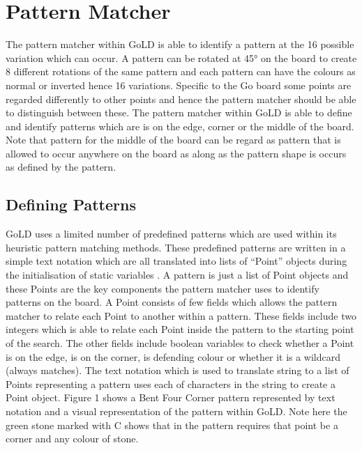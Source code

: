 \documentclass{l4proj}
\begin{document}
\section{Pattern Matcher}
The pattern matcher within GoLD is able to identify a pattern at the 16 possible variation which can occur. A pattern can be rotated at 45° on the board to create 8 different rotations of the same pattern and each pattern can have the colours as normal or inverted hence 16 variations. Specific to the Go board some points are regarded differently to other points and hence the pattern matcher should be able to distinguish between these. The pattern matcher within GoLD is able to define and identify patterns which are is on the edge, corner or the middle of the board. Note that pattern for the middle of the board can be regard as pattern that is allowed to occur anywhere on the board as along as the pattern shape is occurs as defined by the pattern.


\subsection{Defining Patterns}
GoLD uses a limited number of predefined patterns which are used within its heuristic pattern matching methods. These predefined patterns are written in a simple text notation which are all translated into lists of “Point” objects during the initialisation of static variables . A pattern is just a list of Point objects and these Points are the key components the pattern matcher uses to identify patterns on the board. A Point consists of few fields which allows the pattern matcher to relate each Point to another within a pattern. These fields include two integers which is able to relate each Point inside the pattern to the starting point of the search. The other fields include boolean variables to check whether a Point is on the edge, is on the corner, is defending colour or whether it is a wildcard (always matches). The text notation which is used to translate string to a list of Points representing a pattern uses each of characters in the string to create a Point object. Figure 1 shows a Bent Four Corner pattern represented by text notation and a visual representation of the pattern within GoLD. Note here the green stone marked with C shows that in the pattern requires that point be a corner and any colour of stone.
\end{document}
